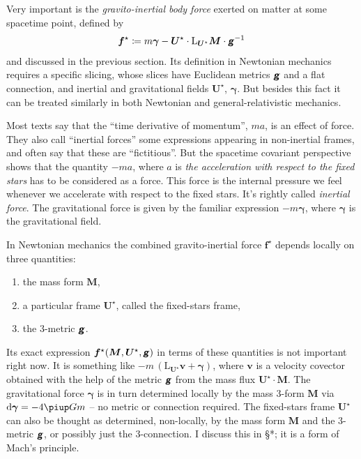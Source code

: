 \documentclass[\ifafour a4paper,12pt,\else a5paper,10pt,\fi%
onecolumn,oneside,article,%
british%
]{memoir}
\theoremstyle{remark}
\theoremstyle{innote}
\newcommand*{\mathte}[1]{\textbf{\textit{\textsf{#1}}}}
\newcommand*{\de}{\partialup}%
\newcommand*{\pu}{\piup}%
\newcommand*{\di}{\mathrm{d}}%
\newcommand*{\defd}{\coloneqq}
\renewcommand*{\|}{\nonscript\,\vert\nonscript\;\mathopen{}}
\newcommand*{\sect}{\S}%
\newcommand*{\Li}{\mathrm{L}}
\newcommand*{\ydd}{m}
\newcommand*{\yd}{\ydd}
\newcommand*{\yrr}{M}
\newcommand*{\yr}{\bm{\yrr}}
\newcommand*{\ybb}{f}
\newcommand*{\yb}{\bm{\ybb}}
\newcommand*{\ybi}{\yb^{\mathord{\star}}}
\newcommand*{\yxxt}{x}
\newcommand*{\yxt}{\bm{\yxxt}}
\newcommand*{\yxto}{\bm{\yxxt}^{\mathord{\star}}}
\newcommand*{\yvvt}{v}
\newcommand*{\yvt}{\bm{\yvvt}}
\newcommand*{\yffg}{\gamma}
\newcommand*{\yfg}{\bm{\yffg}}
\newcommand*{\yomm}{\varOmega}
\newcommand*{\yom}{\bm{\yomm}^{\mathord{\star}}}
\newcommand*{\yFF}{U}
\newcommand*{\yF}{\bm{\yFF}}
\newcommand*{\yFi}{\yF^{\mathord{\star}}}
\newcommand*{\ygg}{g}
\newcommand*{\yg}{\mathte{\ygg}}
\begin{document}
Very important is the \emph{gravito-inertial body force} exerted on matter at some spacetime point, defined by 
\begin{equation}
  \label{eq:gravito-inertial_force_tentative}
  \ybi \defd \yd\yfg - \yFi \cdot \Li_{\yFi}\yr \cdot \yg^{-1}
\end{equation}
and discussed in the previous section. Its definition in Newtonian
mechanics requires a specific slicing, whose slices have Euclidean
metrics $\yg$ and a flat connection, and inertial and gravitational fields
$\yFi$, $\yfg$. But besides this fact it can be treated similarly in both
Newtonian and general-relativistic mechanics.

Most texts say that the \enquote{time derivative of momentum}, $ma$, is an
effect of force. They also call \enquote{inertial forces} some expressions
appearing in non-inertial frames, and often say that these are
\enquote{fictitious}. But the spacetime covariant perspective shows that
the quantity $-ma$, where $a$ is \emph{the acceleration with respect to the
  fixed stars} has to be considered as a force. This force is the internal
pressure we feel whenever we accelerate with respect to the fixed stars.
It's rightly called \emph{inertial force}. The gravitational force is given
by the familiar expression $-m \yfg$, where $\yfg$ is the gravitational
field.


In Newtonian mechanics the combined gravito-inertial force $\ybi$ depends
locally on three quantities:
\begin{enumerate}[label=(\arabic*)]\tightlist
\item the mass form $\yr$,
\item a particular frame $\yFi$, called the fixed-stars frame,
\item the 3-metric $\yg$.
\end{enumerate}
Its exact expression $\ybi(\yr,\yFi,\yg)$ in terms of these quantities is
not important right now. It is something like
$-\yd \,(\Li_{\yFi}\yvt + \yfg)$, where $\yvt$ is a velocity covector
obtained with the help of the metric $\yg$ from the mass flux
$\yFi\cdot\yr$. The gravitational force $\yfg$ is in turn determined
locally by the mass 3-form $\yr$ via $\di\yfg = - 4\pu G \yd$ -- no metric
or connection required. The fixed-stars frame $\yFi$ can also be thought as
determined, non-locally, by the mass form $\yr$ and the 3-metric $\yg$, or
possibly just the 3-connection. I discuss this in \sect**; it is a form of
Mach's principle.
\end{document}
